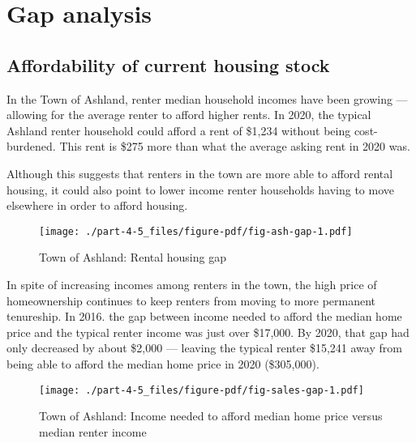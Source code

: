 \documentclass[
  letterpaper,
  DIV=11,
  numbers=noendperiod]{scrreprt}
\begin{document}
\hypertarget{gap-analysis-4}{%
\section{Gap analysis}\label{gap-analysis-4}}

\hypertarget{affordability-of-current-housing-stock-4}{%
\subsection{Affordability of current housing
stock}\label{affordability-of-current-housing-stock-4}}

In the Town of Ashland, renter median household incomes have been
growing --- allowing for the average renter to afford higher rents. In
2020, the typical Ashland renter household could afford a rent of
\$1,234 without being cost-burdened. This rent is \$275 more than what
the average asking rent in 2020 was.

Although this suggests that renters in the town are more able to afford
rental housing, it could also point to lower income renter households
having to move elsewhere in order to afford housing.

\begin{figure}

{\centering \texttt{[image: ./part-4-5\_files/figure-pdf/fig-ash-gap-1.pdf]}

}

\caption{\label{fig-ash-gap}Town of Ashland: Rental housing gap}

\end{figure}

In spite of increasing incomes among renters in the town, the high price
of homeownership continues to keep renters from moving to more permanent
tenureship. In 2016. the gap between income needed to afford the median
home price and the typical renter income was just over \$17,000. By
2020, that gap had only decreased by about \$2,000 --- leaving the
typical renter \$15,241 away from being able to afford the median home
price in 2020 (\$305,000).

\begin{figure}

{\centering \texttt{[image: ./part-4-5\_files/figure-pdf/fig-sales-gap-1.pdf]}

}

\caption{\label{fig-sales-gap}Town of Ashland: Income needed to afford
median home price versus median renter income}

\end{figure}
\end{document}
